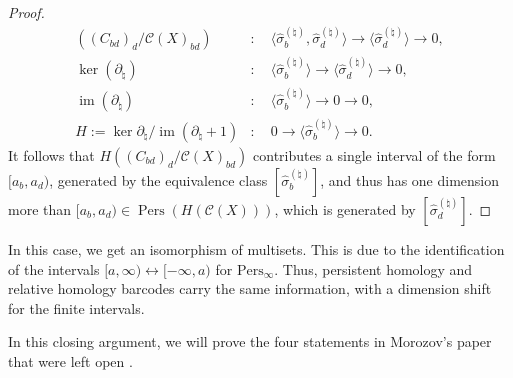 \begin{proof}{\textit{\cite[Proof of Proposition 2.4]{de2011dualities}}}
\begin{align}
((C_{bd})_d/\mathcal{C}(X)_{bd}) &: \quad \langle \hat{\sigma}^{(\natural)}_b, \hat{\sigma}^{(\natural)}_d \rangle \rightarrow \langle \hat{\sigma}^{(\natural)}_d \rangle \rightarrow 0,\nonumber\\
\ker(\partial_\natural) &: \quad \langle \hat{\sigma}^{(\natural)}_b \rangle \rightarrow \langle \hat{\sigma}^{(\natural)}_d \rangle \rightarrow 0, \nonumber\\
\operatorname{im}(\partial_\natural) &: \quad \langle \hat{\sigma}^{(\natural)}_b \rangle \rightarrow 0 \rightarrow 0,\nonumber\\
H := \ker{\partial_\natural} / \operatorname{im}(\partial_\natural+1) &: \quad 0 \rightarrow \langle \hat{\sigma}^{(\natural)}_b \rangle \rightarrow 0.
\end{align}
It follows that $H((C_{bd})_d/\mathcal{C}(X)_{bd})$ contributes a single interval of the form $[a_b,a_d)$, generated by the equivalence class $[\hat{\sigma}^{(\natural)}_b]$, and thus has one dimension more than $[a_b,a_d) \in \operatorname{Pers}(H(\mathcal{C}(X)))$, which is generated by $[\hat{\sigma}^{(\natural)}_d]$.
\end{proof}

\begin{remark}{\cite[Proposition 2.4]{de2011dualities}}
	In this case, we get an isomorphism of multisets. This is due to the identification
	of the intervals $[a,\infty) \leftrightarrow [-\infty, a)$ for $\mathrm{Pers}_{\infty}$.
	Thus, persistent homology and relative homology barcodes carry the same information,
	with a dimension shift for the finite intervals.
\end{remark}

In this closing argument, we will prove the four statements in Morozov's paper that were left open \cite[\S 2.8]{de2011dualities}.

